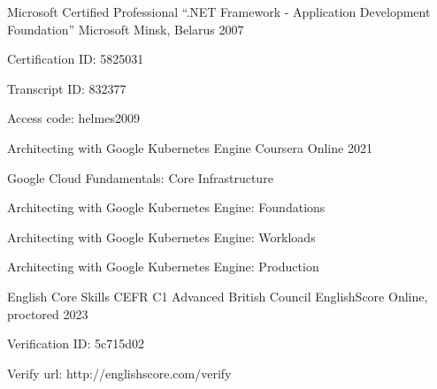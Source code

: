 

\begin{cventries}

  \cventry
   {Microsoft Certified Professional “.NET Framework - Application Development Foundation”} %
   {Microsoft} %
   {Minsk, Belarus} %
   {2007} %
   {
     \begin{cvitems} %
       \item {Certification ID: 5825031}
       \item {Transcript ID: 832377}
       \item {Access code: helmes2009}
     \end{cvitems}
   }

  \cventry
   {Architecting with Google Kubernetes Engine} %
   {Coursera} %
   {Online} %
   {2021} %
   {
     \begin{cvitems} %
       \item {Google Cloud Fundamentals: Core Infrastructure}
       \item {Architecting with Google Kubernetes Engine: Foundations}
       \item {Architecting with Google Kubernetes Engine: Workloads}
       \item {Architecting with Google Kubernetes Engine: Production}
     \end{cvitems}
   }

  \cventry
   {English Core Skills CEFR C1 Advanced} %
   {British Council EnglishScore} %
   {Online, proctored} %
   {2023} %
   {
     \begin{cvitems} %
       \item {Verification ID: 5c715d02}
       \item {Verify url: http://englishscore.com/verify}
     \end{cvitems}
   }

\end{cventries}
